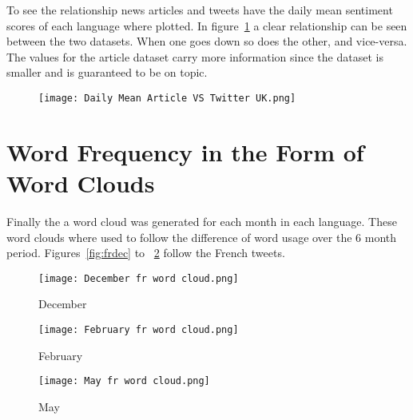 To see the relationship news articles and tweets have the daily mean sentiment scores of each language where plotted.
In figure~\ref{fig:artcilevstwitter} a clear relationship can be seen between the two datasets.
When one goes down so does the other, and vice-versa.
The values for the article dataset carry more information since the dataset is smaller and is guaranteed to be on topic.

\begin{figure}[h!]
\texttt{[image: Daily Mean Article VS Twitter UK.png]}
\caption[Daily Mean Article VS Twitter]{ }
\label{fig:artcilevstwitter}
\end{figure}

\section{Word Frequency in the Form of Word Clouds}

Finally the a word cloud was generated for each month in each language.
These word clouds where used to follow the difference of word usage over the 6 month period.
Figures~\ref{fig:frdec} to ~\ref{fig:frmay} follow the French tweets.

\begin{figure}[!htb]
  \texttt{[image: December fr word cloud.png]}
  \caption[French word cloud for December]{December}\label{fig:frdec}
\endminipage\hfill
{}
  \texttt{[image: February fr word cloud.png]}
  \caption[French Word cloud for February]{February}\label{fig:frfeb}
\endminipage\hfill
{}
  \texttt{[image: May fr word cloud.png]}
  \caption[French Word cloud for May]{May}\label{fig:frmay}
\endminipage
\end{figure}
